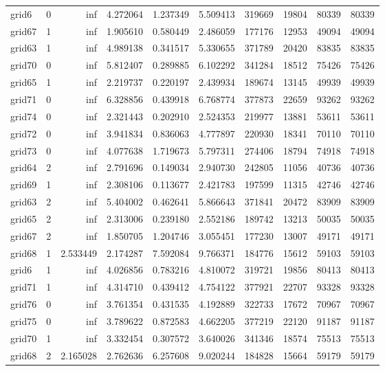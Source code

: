 \begin{longtable}{|l|r|r|r|r|r|r|r|r|r|}
grid6 & 0 & inf & 4.272064 & 1.237349 & 5.509413 & 319669 & 19804 & 80339 & 80339 \\
grid67 & 1 & inf & 1.905610 & 0.580449 & 2.486059 & 177176 & 12953 & 49094 & 49094 \\
grid63 & 1 & inf & 4.989138 & 0.341517 & 5.330655 & 371789 & 20420 & 83835 & 83835 \\
grid70 & 0 & inf & 5.812407 & 0.289885 & 6.102292 & 341284 & 18512 & 75426 & 75426 \\
grid65 & 1 & inf & 2.219737 & 0.220197 & 2.439934 & 189674 & 13145 & 49939 & 49939 \\
grid71 & 0 & inf & 6.328856 & 0.439918 & 6.768774 & 377873 & 22659 & 93262 & 93262 \\
grid74 & 0 & inf & 2.321443 & 0.202910 & 2.524353 & 219977 & 13881 & 53611 & 53611 \\
grid72 & 0 & inf & 3.941834 & 0.836063 & 4.777897 & 220930 & 18341 & 70110 & 70110 \\
grid73 & 0 & inf & 4.077638 & 1.719673 & 5.797311 & 274406 & 18794 & 74918 & 74918 \\
grid64 & 2 & inf & 2.791696 & 0.149034 & 2.940730 & 242805 & 11056 & 40736 & 40736 \\
grid69 & 1 & inf & 2.308106 & 0.113677 & 2.421783 & 197599 & 11315 & 42746 & 42746 \\
grid63 & 2 & inf & 5.404002 & 0.462641 & 5.866643 & 371841 & 20472 & 83909 & 83909 \\
grid65 & 2 & inf & 2.313006 & 0.239180 & 2.552186 & 189742 & 13213 & 50035 & 50035 \\
grid67 & 2 & inf & 1.850705 & 1.204746 & 3.055451 & 177230 & 13007 & 49171 & 49171 \\
grid68 & 1 & 2.533449 & 2.174287 & 7.592084 & 9.766371 & 184776 & 15612 & 59103 & 59103 \\
grid6 & 1 & inf & 4.026856 & 0.783216 & 4.810072 & 319721 & 19856 & 80413 & 80413 \\
grid71 & 1 & inf & 4.314710 & 0.439412 & 4.754122 & 377921 & 22707 & 93328 & 93328 \\
grid76 & 0 & inf & 3.761354 & 0.431535 & 4.192889 & 322733 & 17672 & 70967 & 70967 \\
grid75 & 0 & inf & 3.789622 & 0.872583 & 4.662205 & 377219 & 22120 & 91187 & 91187 \\
grid70 & 1 & inf & 3.332454 & 0.307572 & 3.640026 & 341346 & 18574 & 75513 & 75513 \\
grid68 & 2 & 2.165028 & 2.762636 & 6.257608 & 9.020244 & 184828 & 15664 & 59179 & 59179 \\

\end{longtable}
